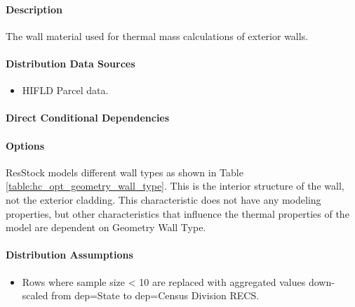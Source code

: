 \paragraph{Description}
% 
The wall material used for thermal mass calculations of exterior walls.

\paragraph{Distribution Data Sources}
% 
\begin{itemize}

\item
  HIFLD Parcel data.
\end{itemize}

\paragraph{Direct Conditional Dependencies}


\paragraph{Options}
ResStock models different wall types as shown in Table \ref{table:hc_opt_geometry_wall_type}. This is the interior structure of the wall, not the exterior cladding. This characteristic does not have any modeling properties, but other characteristics that influence the thermal properties of the model are dependent on Geometry Wall Type.



\paragraph{Distribution Assumptions}
% 
\begin{itemize}

\item
  Rows where sample size \textless{} 10 are replaced with aggregated
  values down-scaled from dep=\textquotesingle State\textquotesingle{}
  to dep=\textquotesingle Census Division RECS\textquotesingle{}.
\end{itemize}
